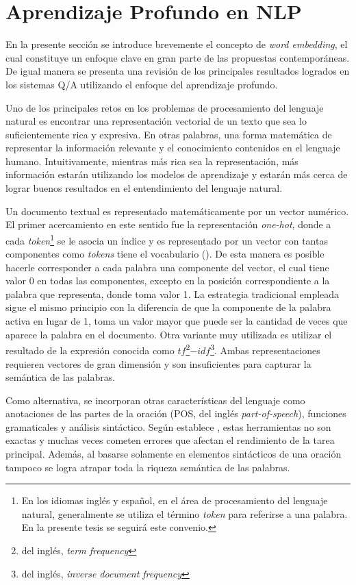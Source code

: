 \section{Aprendizaje Profundo en NLP}

En la presente sección se introduce brevemente el concepto de \textit{word embedding}, el cual constituye un enfoque clave en gran parte de las propuestas contemporáneas. De igual manera se presenta una revisión de los principales resultados logrados en los sistemas Q/A utilizando el enfoque del aprendizaje profundo.

Uno de los principales retos en los problemas de procesamiento del lenguaje natural es encontrar una representación vectorial de un texto que sea lo suficientemente rica y expresiva. En otras palabras, una forma matemática de representar la información relevante y el conocimiento contenidos en el lenguaje humano. Intuitivamente, mientras más rica sea la representación, más información estarán utilizando los modelos de aprendizaje y estarán más cerca de lograr buenos resultados en el entendimiento del lenguaje natural.

Un documento textual es representado matemáticamente por un vector numérico. El primer acercamiento en este sentido fue la representación \textit{one-hot}, donde a cada \textit{token}\footnote{En los idiomas inglés y español, en el área de procesamiento del lenguaje natural, generalmente se utiliza el término \textit{token} para referirse a una palabra. En la presente tesis se seguirá este convenio.} se le asocia un índice y es representado por un vector con tantas componentes como \textit{tokens} tiene el vocabulario (\cite{goyal-2018-deepnlp}). De esta manera es posible hacerle corresponder a cada palabra una componente del vector, el cual tiene valor 0 en todas las componentes, excepto en la posición correspondiente a la palabra que representa, donde toma valor 1. La estrategia tradicional empleada sigue el mismo principio con la diferencia de que la componente de la palabra activa en lugar de 1, toma un valor mayor que puede ser la cantidad de veces que aparece la palabra en el documento. Otra variante muy utilizada es utilizar el resultado de la expresión conocida como $tf$\footnote{del inglés, \textit{term frequency}}$-idf$\footnote{del inglés, \textit{inverse document frequency}}. Ambas representaciones requieren vectores de gran dimensión y son insuficientes para capturar la semántica de las palabras.

Como alternativa, se incorporan otras características del lenguaje como anotaciones de las partes de la oración (POS, del inglés \textit{part-of-speech}), funciones gramaticales y análisis sintáctico. Según establece \cite{chollet-2017-deeplearningpython}, estas herramientas no son exactas y muchas veces cometen errores que afectan el rendimiento de la tarea principal. Además, al basarse solamente en elementos sintácticos de una oración tampoco se logra atrapar toda la riqueza semántica de las palabras.

